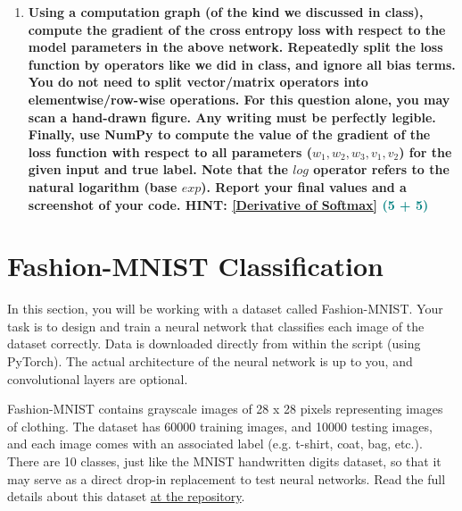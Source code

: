 \documentclass[a4paper]{article}
\begin{document}
\begin{sloppypar}
\begin{enumerate}[start=1,label=Q\arabic*,left=0pt]
    \item \textbf{Using a computation graph (of the kind we discussed in class), compute the gradient
    of the cross entropy loss with respect to the model parameters in the above network. Repeatedly split 
    the loss function by operators like we did in class, and ignore all bias terms.
    You do not need to split vector/matrix operators into elementwise/row-wise operations.
    For this question alone, you may scan a hand-drawn figure. Any writing must be perfectly
    legible. Finally, use NumPy to compute the value of the gradient of the loss function with
    respect to all parameters ($w_1, w_2, w_3, v_1, v_2$) for the given input and true label. Note that
    the $log$ operator refers to the natural logarithm (base $exp$). Report your final values and a
    screenshot of your code. HINT: \href{https://towardsdatascience.com/derivative-of-the-softmax-function-and-the-categorical-cross-entropy-loss-ffceefc081d1}{[Derivative of Softmax]} \hfill \textcolor{teal}{(5 + 5)}}
    
    \par 

\end{enumerate}

\section{Fashion-MNIST Classification}

\par In this section, you will be working with a dataset called Fashion-MNIST. Your task is to
design and train a neural network that classifies each image of the dataset correctly. Data
is downloaded directly from within the script (using PyTorch). The actual architecture of
the neural network is up to you, and convolutional layers are optional.

\vspace{\baselineskip}

\noindent Fashion-MNIST contains grayscale images of 28 x 28 pixels representing images of clothing. 
The dataset has 60000 training images, and 10000 testing images, and each image
comes with an associated label (e.g. t-shirt, coat, bag, etc.). There are 10 classes, just
like the MNIST handwritten digits dataset, so that it may serve as a direct drop-in replacement 
to test neural networks. Read the full details about this dataset \href{https://github.com/zalandoresearch/fashion-mnist}{at the repository}.

\vspace{\baselineskip}


\end{sloppypar}
\end{document}
